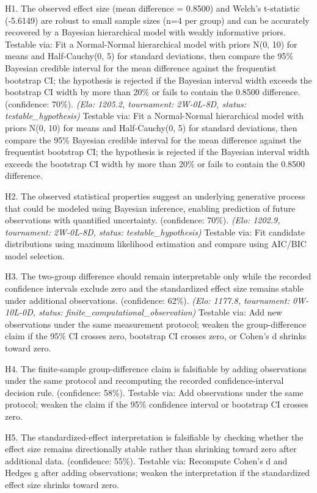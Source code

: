 \documentclass[11pt,a4paper]{article}
\begin{document}
H1. The observed effect size (mean difference = 0.8500) and Welch's t-statistic (-5.6149) are robust to small sample sizes (n=4 per group) and can be accurately recovered by a Bayesian hierarchical model with weakly informative priors. Testable via: Fit a Normal-Normal hierarchical model with priors N(0, 10) for means and Half-Cauchy(0, 5) for standard deviations, then compare the 95\% Bayesian credible interval for the mean difference against the frequentist bootstrap CI; the hypothesis is rejected if the Bayesian interval width exceeds the bootstrap CI width by more than 20\% or fails to contain the 0.8500 difference. (confidence: 70\%). \textit{(Elo: 1205.2, tournament: 2W-0L-8D, status: testable\_hypothesis)} Testable via: Fit a Normal-Normal hierarchical model with priors N(0, 10) for means and Half-Cauchy(0, 5) for standard deviations, then compare the 95\% Bayesian credible interval for the mean difference against the frequentist bootstrap CI; the hypothesis is rejected if the Bayesian interval width exceeds the bootstrap CI width by more than 20\% or fails to contain the 0.8500 difference.

H2. The observed statistical properties suggest an underlying generative process that could be modeled using Bayesian inference, enabling prediction of future observations with quantified uncertainty. (confidence: 70\%). \textit{(Elo: 1202.9, tournament: 2W-0L-8D, status: testable\_hypothesis)} Testable via: Fit candidate distributions using maximum likelihood estimation and compare using AIC/BIC model selection.

H3. The two-group difference should remain interpretable only while the recorded confidence intervals exclude zero and the standardized effect size remains stable under additional observations. (confidence: 62\%). \textit{(Elo: 1177.8, tournament: 0W-10L-0D, status: finite\_computational\_observation)} Testable via: Add new observations under the same measurement protocol; weaken the group-difference claim if the 95\% CI crosses zero, bootstrap CI crosses zero, or Cohen's d shrinks toward zero.

H4. The finite-sample group-difference claim is falsifiable by adding observations under the same protocol and recomputing the recorded confidence-interval decision rule. (confidence: 58\%). Testable via: Add observations under the same protocol; weaken the claim if the 95\% confidence interval or bootstrap CI crosses zero.

H5. The standardized-effect interpretation is falsifiable by checking whether the effect size remains directionally stable rather than shrinking toward zero after additional data. (confidence: 55\%). Testable via: Recompute Cohen's d and Hedges g after adding observations; weaken the interpretation if the standardized effect size shrinks toward zero.
\end{document}
